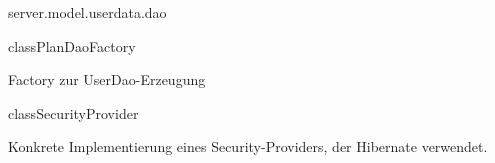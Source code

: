 \begin{texdocpackage}{server.model.userdata.dao}
\begin{texdocclass}{class}{PlanDaoFactory}
\label{texdoclet:edu.kit.informatik.studyplan.server.model.userdata.dao.PlanDaoFactory}
\begin{texdocclassintro}
Factory zur UserDao-Erzeugung\end{texdocclassintro}
\begin{texdocclassconstructors}
\end{texdocclassconstructors}
\begin{texdocclassmethods}
\end{texdocclassmethods}
\end{texdocclass}


\begin{texdocclass}{class}{SecurityProvider}
\label{texdoclet:edu.kit.informatik.studyplan.server.model.userdata.dao.SecurityProvider}
\begin{texdocclassintro}
Konkrete Implementierung eines Security-Providers, der Hibernate verwendet.\end{texdocclassintro}
\begin{texdocclassconstructors}
\end{texdocclassconstructors}
\begin{texdocclassmethods}
\end{texdocclassmethods}
\end{texdocclass}



\end{texdocpackage}
